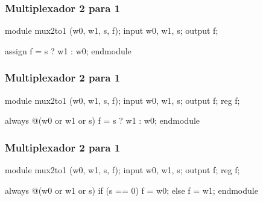 
\begin{frame}[fragile]
	\frametitle{Multiplexador 2 para 1}
	\begin{verilogcode}
module mux2to1 (w0, w1, s, f); 
  input w0, w1, s;
  output f;

  assign f = s ? w1 : w0; 
endmodule
	\end{verilogcode} 
\end{frame}

\begin{frame}[fragile]
	\frametitle{Multiplexador 2 para 1}
	\begin{verilogcode}
module mux2to1 (w0, w1, s, f); 
  input w0, w1, s;
  output f;
  reg f;

  always @(w0 or w1 or s) 
    f = s ? w1 : w0;
endmodule
	\end{verilogcode} 
\end{frame}

\begin{frame}[fragile]
	\frametitle{Multiplexador 2 para 1}
	\begin{verilogcode}
module mux2to1 (w0, w1, s, f); 
  input w0, w1, s;
  output f;
  reg f;

  always @(w0 or w1 or s) 
    if (s == 0)
      f = w0;
    else
      f = w1;
endmodule
	\end{verilogcode} 
\end{frame}

